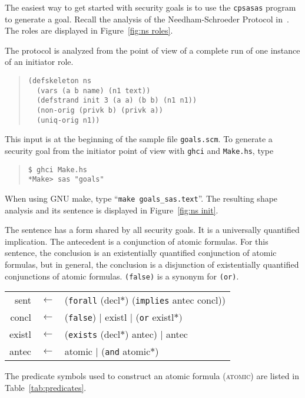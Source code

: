 \documentclass[12pt]{article}
\newcommand{\sym}[1]{\textup{\texttt{#1}}}
\begin{document}
The easiest way to get started with security goals is to use the
\texttt{cpsasas} program to generate a goal.  Recall the analysis of
the Needham-Schroeder Protocol in~\cite[Section~10]{cpsaprimer09}.
The roles are displayed in Figure~\ref{fig:ns roles}.

The protocol is analyzed from the point of view of a complete run of
one instance of an initiator role.

\begin{quote}
\begin{verbatim}
(defskeleton ns
  (vars (a b name) (n1 text))
  (defstrand init 3 (a a) (b b) (n1 n1))
  (non-orig (privk b) (privk a))
  (uniq-orig n1))
\end{verbatim}
\end{quote}

This {\cpsa} input is at the beginning of the sample file
\texttt{goals.scm}.  To generate a security goal from the initiator
point of view with \texttt{ghci} and \texttt{Make.hs}, type
\begin{quote}
\begin{verbatim}
$ ghci Make.hs
*Make> sas "goals"
\end{verbatim}
\end{quote}
When using GNU make, type ``\texttt{make goals\_sas.text}''.  The
resulting shape analysis and its sentence is displayed in
Figure~\ref{fig:ns init}.

The sentence has a form shared by all security goals.  It is a
universally quantified implication.  The antecedent is a conjunction
of atomic formulas.  For this sentence, the conclusion is an
existentially quantified conjunction of atomic formulas, but in
general, the conclusion is a disjunction of existentially quantified
conjunctions of atomic formulas.  \sym{(false)} is a synonym for
\sym{(or)}.

\begin{center}\scshape
  \begin{tabular}{rcl}
  sent&$\leftarrow$&(\sym{forall} (decl$\ast$) (\sym{implies} antec concl))
  \\ concl&$\leftarrow$&(\sym{false})
  $\mid$ existl $\mid$ (\sym{or} existl$\ast)$
  \\ existl&$\leftarrow$&(\sym{exists}
  (decl$\ast$) antec) $\mid$ antec
  \\ antec&$\leftarrow$&atomic $\mid$ (\sym{and} atomic$\ast$)
  \end{tabular}
\end{center}
The predicate symbols used to construct an atomic formula
(\textsc{atomic}) are listed in Table~\ref{tab:predicates}.
\end{document}
